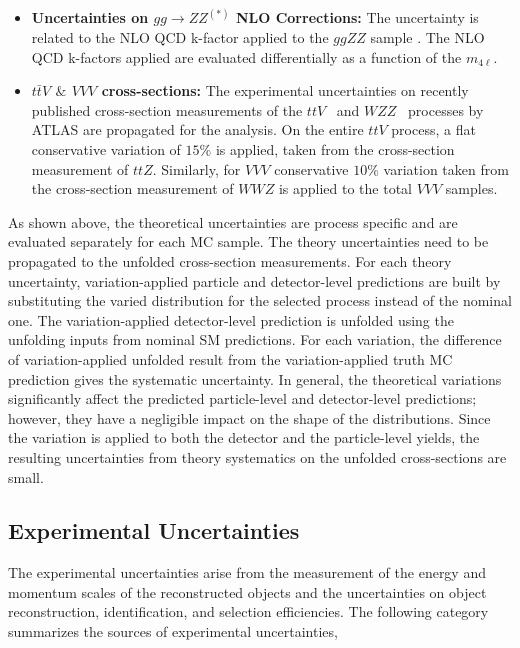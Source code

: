 \begin{itemize}
\item{\textbf{Uncertainties on $gg\rightarrow ZZ^{(\ast)}$ NLO Corrections:}
The uncertainty is related to the NLO QCD k-factor applied to the $ggZZ$ sample \cite{ggZZNLOUnc}. The NLO QCD k-factors applied are evaluated differentially as a function of the $m_{4\ell}$. 
}

\item{\textbf{$t\bar{t}V$ $\&$ $VVV$ cross-sections:}
The experimental uncertainties on recently published cross-section measurements of the $ttV$~\cite{ATLAS_ttV} and $WZZ$~\cite{ATLAS_VVV} processes by ATLAS are propagated for the analysis. On the entire $ttV$ process, a flat conservative variation of $15\%$ is applied, taken from the cross-section measurement of $ttZ$. Similarly, for $VVV$ conservative $10\%$ variation taken from the cross-section measurement of $WWZ$ is applied to the total $VVV$ samples.
}

\end{itemize}

As shown above, the theoretical uncertainties are process specific and are evaluated separately for each MC sample. The theory uncertainties need to be propagated to the unfolded cross-section measurements. For each theory uncertainty, variation-applied particle and detector-level predictions are built by substituting the varied distribution for the selected process instead of the nominal one. The variation-applied detector-level prediction is unfolded using the unfolding inputs from nominal SM predictions. For each variation, the difference of variation-applied unfolded result from the variation-applied truth MC prediction gives the systematic uncertainty. In general, the theoretical variations significantly affect the predicted particle-level and detector-level predictions; however, they have a negligible impact on the shape of the distributions. Since the variation is applied to both the detector and the particle-level yields, the resulting uncertainties from theory systematics on the unfolded cross-sections are small.

\subsection{Experimental Uncertainties}
\label{subsec:ExpUnc}
The experimental uncertainties arise from the measurement of the energy and momentum scales of the reconstructed objects and the uncertainties on object reconstruction, identification, and selection efficiencies. The following category summarizes the sources of experimental uncertainties,

